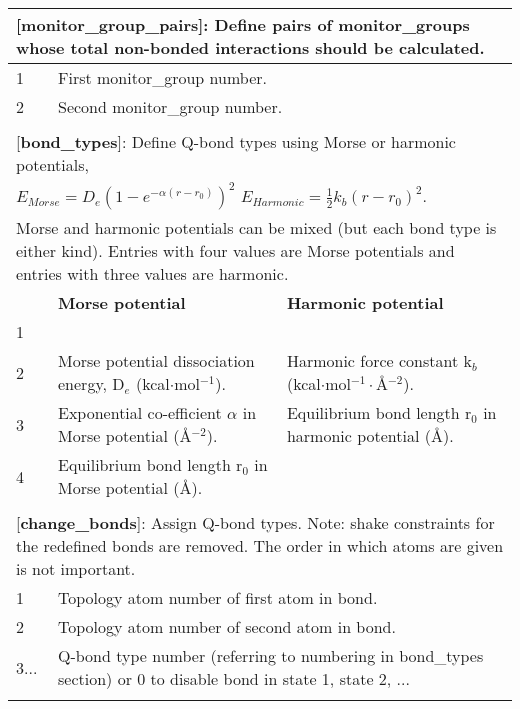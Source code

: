 \documentclass[a4paper,11pt]{article}
\begin{document}
\begin{longtable}{|p{53pt}|p{181pt}|p{160pt}|}
\multicolumn{3}{p{394pt}}{[\textbf{monitor\_group\_pairs}]: Define pairs of monitor\_groups whose total non-bonded interactions should be calculated.}\\
\hline 1 & \multicolumn{2}{p{341pt}|}{First monitor\_group number.}\\
\hline 2 & \multicolumn{2}{p{341pt}|}{Second monitor\_group number.}\\
\hline
\multicolumn{3}{p{394pt}}{}\\

\multicolumn{3}{p{394pt}}{[\textbf{bond\_types}]: Define Q-bond types using Morse or harmonic potentials,}\\
\multicolumn{3}{p{394pt}}{$E_{Morse}=D_e \left(1-e^{-\alpha\left(r-r_0\right)}\right)^2$   $E_{Harmonic}=\frac{1}{2}k_b\left(r-r_0\right)^2$.}\\
\multicolumn{3}{p{394pt}}{Morse and harmonic potentials can be mixed (but each bond type is either kind). Entries with four values are Morse potentials and entries with three values are harmonic.}\\
\hline & \textbf{Morse potential} & \textbf{Harmonic potential}\\
\hline 1 & \multicolumn{2}{p{341pt}|}{\centering{Q-bond type number (starting with 1).}}\\
\hline 2 & Morse potential dissociation energy, D$_e$ (kcal$\cdot$mol$^{-1}$). &  Harmonic force constant k$_b$ (kcal$\cdot$mol$^{-1}\cdot${\AA}$^{-2}$).\\
\hline 3 & Exponential co-efficient $\alpha$ in Morse potential ({\AA}$^{-2}$). & Equilibrium bond length r$_0$ in harmonic potential ({\AA}).\\
\hline 4 & Equilibrium bond length r$_0$ in Morse potential ({\AA}).&\\
\hline
\multicolumn{3}{p{394pt}}{}\\

\multicolumn{3}{p{394pt}}{[\textbf{change\_bonds}]: Assign Q-bond types. Note: shake constraints for the redefined bonds are removed. The order in which atoms are given is not important.}\\
\hline 1 & \multicolumn{2}{p{341pt}|}{Topology atom number of first atom in bond.}\\
\hline 2 & \multicolumn{2}{p{341pt}|}{Topology atom number of second atom in bond.}\\
\hline 3... & \multicolumn{2}{p{341pt}|}{Q-bond type number (referring to numbering in bond\_types section) or 0 to disable bond in state 1, state 2, ...}\\
\hline
\multicolumn{3}{p{394pt}}{}\\


\end{longtable}
\end{document}
